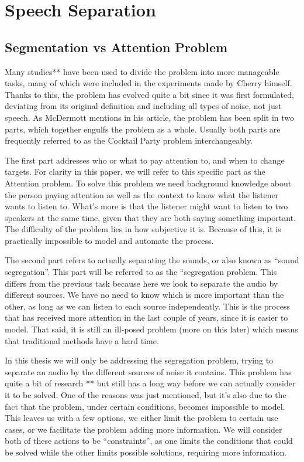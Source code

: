 \documentclass{book}
\begin{document}
\chapter{Speech Separation}
\section{Segmentation vs Attention Problem}
\qquad Many studies** have been used to divide the problem into more manageable tasks, many of which were included in the experiments made by Cherry himself.
Thanks to this, the problem has evolved quite a bit since it was first formulated, deviating from its original definition and including all types of noise, not just speech.
As McDermott mentions in his article\cite{CocktailPartyProblemRevisit}, the problem has been split in two parts, which together engulfs the problem as a whole.
Usually both parts are frequently referred to as the Cocktail Party problem interchangeably.
\par
The first part addresses who or what to pay attention to, and when to change targets.
For clarity in this paper, we will refer to this specific part as the Attention problem.
To solve this problem we need background knowledge about the person paying attention as well as the context to know what the listener wants to listen to.
What's more is that the listener might want to listen to two speakers at the same time, given that they are both saying something important.
The difficulty of the problem lies in how subjective it is.
Because of this, it is practically impossible to model and automate the process.
\par
The second part refers to actually separating the sounds, or also known as “sound segregation”.
This part will be referred to as the “segregation problem.
This differs from the previous task because here we look to separate the audio by different sources.
We have no need to know which is more important than the other, as long as we can listen to each source independently.
This is the process that has received more attention in the last couple of years, since it is easier to model.
That said, it is still an ill-posed problem (more on this later) which means that traditional methods have a hard time.
\par
In this thesis we will only be addressing the segregation problem, trying to separate an audio by the different sources of noise it contains.
This problem has quite a bit of research ** but still has a long way before we can actually consider it to be solved.
One of the reasons was just mentioned, but it’s also due to the fact that the problem, under certain conditions, becomes impossible to model.
This leaves us with a few options, we either limit the problem to certain use cases, or we facilitate the problem adding more information.
We will consider both of these actions to be “constraints”, as one limits the conditions that could be solved while the other limits possible solutions, requiring more information.
\end{document}
